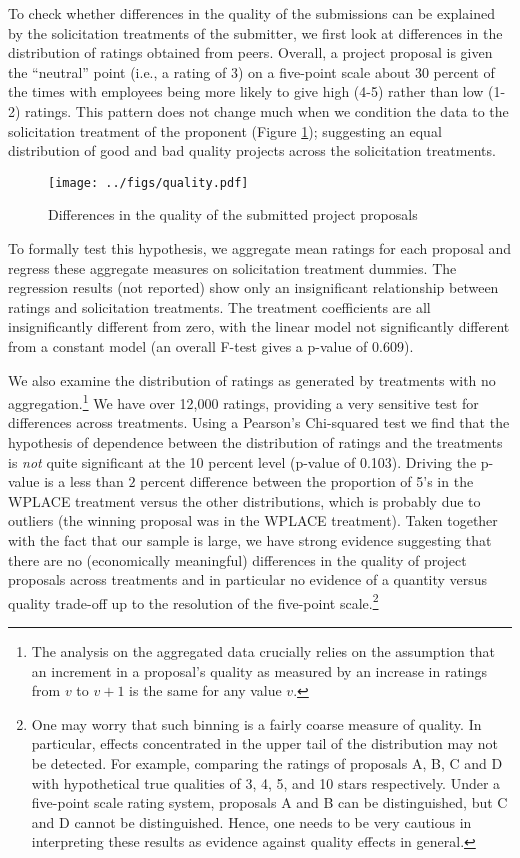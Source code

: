 \documentclass[11pt, titlepage]{article}
\begin{document}
To check whether differences in the quality of the submissions can be
explained by the solicitation treatments of the submitter, we first look
at differences in the distribution of ratings obtained from peers.
Overall, a project proposal is given the ``neutral'' point (i.e., a
rating of 3) on a five-point scale about 30 percent of the times with
employees being more likely to give high (4-5) rather than low (1-2)
ratings. This pattern does not change much when we condition the data to
the solicitation treatment of the proponent (Figure \ref{fig: quality});
suggesting an equal distribution of good and bad quality projects across
the solicitation treatments.

\begin{figure}
\centering
\caption{Differences in the quality of the submitted project proposals}
\label{fig: quality}
\texttt{[image: ../figs/quality.pdf]}
\end{figure}

To formally test this hypothesis, we aggregate mean ratings for each
proposal and regress these aggregate measures on solicitation treatment
dummies. The regression results (not reported) show only an
insignificant relationship between ratings and solicitation treatments.
The treatment coefficients are all insignificantly different from zero,
with the linear model not significantly different from a constant model
(an overall F-test gives a p-value of 0.609).

We also examine the distribution of ratings as generated by treatments
with no aggregation.\footnote{The analysis on the aggregated data
  crucially relies on the assumption that an increment in a proposal's
  quality as measured by an increase in ratings from \(v\) to \(v+1\) is
  the same for any value \(v\).} We have over 12,000 ratings, providing
a very sensitive test for differences across treatments. Using a
Pearson's Chi-squared test we find that the hypothesis of dependence
between the distribution of ratings and the treatments is \emph{not}
quite significant at the 10 percent level (p-value of 0.103). Driving
the p-value is a less than \(2\) percent difference between the
proportion of 5's in the WPLACE treatment versus the other
distributions, which is probably due to outliers (the winning proposal
was in the WPLACE treatment). Taken together with the fact that our
sample is large, we have strong evidence suggesting that there are no
(economically meaningful) differences in the quality of project
proposals across treatments and in particular no evidence of a quantity
versus quality trade-off up to the resolution of the five-point
scale.\footnote{One may worry that such binning is a fairly coarse
  measure of quality. In particular, effects concentrated in the upper
  tail of the distribution may not be detected. For example, comparing
  the ratings of proposals A, B, C and D with hypothetical true
  qualities of 3, 4, 5, and 10 stars respectively. Under a five-point
  scale rating system, proposals A and B can be distinguished, but C and
  D cannot be distinguished. Hence, one needs to be very cautious in
  interpreting these results as evidence against quality effects in
  general.}
\end{document}
